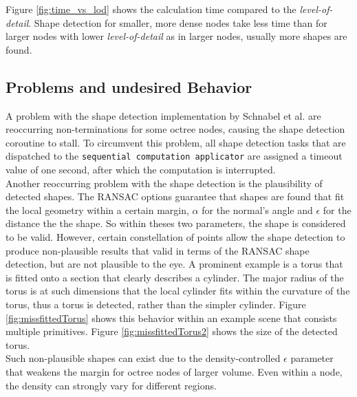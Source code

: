 Figure \ref{fig:time_vs_lod} shows the calculation time compared to the \textit{level-of-detail}. Shape detection for smaller, more dense nodes take less time than for larger nodes with lower \textit{level-of-detail} as in larger nodes, usually more shapes are found. 


\subsection{Problems and undesired Behavior}

A problem with the shape detection implementation by Schnabel et al.\cite{schnabel-2007-software} are reoccurring non-terminations for some octree nodes, causing the shape detection coroutine to stall. To circumvent this problem, all shape detection tasks that are dispatched to the \verb|sequential computation applicator| are assigned a timeout value of one second, after which the computation is interrupted. 
\\
Another reoccurring problem with the shape detection is the plausibility of detected shapes. The RANSAC options guarantee that shapes are found that fit the local geometry within a certain margin, $\alpha$ for the normal's angle and $\epsilon$ for the distance the the shape. So within theses two parameters, the shape is considered to be valid. However, certain constellation of points allow the shape detection to produce non-plausible results that valid in terms of the RANSAC shape detection, but are not plausible to the eye. A prominent example is a torus that is fitted onto a section that clearly describes a cylinder. The major radius of the torus is at such dimensions that the local cylinder fits within the curvature of the torus, thus a torus is detected, rather than the simpler cylinder. Figure \ref{fig:missfittedTorus} shows this behavior within an example scene that consists multiple primitives. Figure \ref{fig:missfittedTorus2} shows the size of the detected torus. 
\\
Such non-plausible shapes can exist due to the density-controlled $\epsilon$ parameter that weakens the margin for octree nodes of larger volume. Even within a node, the density can strongly vary for different regions. 

